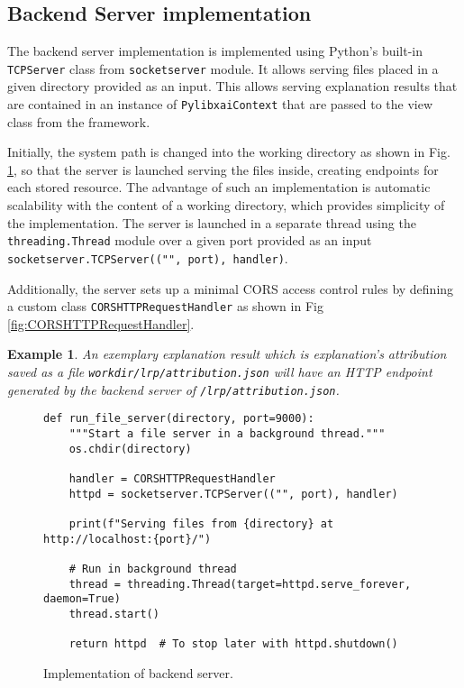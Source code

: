 \documentclass[
    bindingoffset=5mm,  %
    footnoteindent=3mm, %
    hyphenation=true    %
]{src/wut-thesis}
\newtheorem{example}{Example}
\begin{document}
\subsection{Backend Server implementation} \label{ch5:FileServer}

The backend server implementation is implemented using Python's built-in \texttt{TCPServer} class from
\texttt{socketserver} module. It allows serving files placed in a given directory provided as an input.
This allows serving explanation results that are contained in an instance of \texttt{PylibxaiContext} that
are passed to the view class from the framework.

Initially, the system path is changed into the working directory as shown in Fig. \ref{fig:BackendServer},
so that the server is launched serving the files inside, creating endpoints for each stored resource.
The advantage of such an implementation is automatic scalability with the content of a working directory,
which provides simplicity of the implementation. The server is launched in a separate thread using the 
\texttt{threading.Thread} module over a given port provided as an input
\texttt{socketserver.TCPServer(("", port), handler)}.

Additionally, the server sets up a minimal CORS access control rules by defining a custom
class \texttt{CORSHTTPRequestHandler} as shown in Fig \ref{fig:CORSHTTPRequestHandler}.

\begin{example}
    An exemplary explanation result which is explanation's attribution saved as a file \texttt{workdir/lrp/attribution.json}
    will have an HTTP endpoint generated by the backend server of \texttt{/lrp/attribution.json}.
\end{example}

\begin{figure}%
\begin{verbatim}
def run_file_server(directory, port=9000):
    """Start a file server in a background thread."""
    os.chdir(directory)

    handler = CORSHTTPRequestHandler
    httpd = socketserver.TCPServer(("", port), handler)

    print(f"Serving files from {directory} at http://localhost:{port}/")

    # Run in background thread
    thread = threading.Thread(target=httpd.serve_forever, daemon=True)
    thread.start()

    return httpd  # To stop later with httpd.shutdown()

\end{verbatim}
\caption{Implementation of backend server.}
\label{fig:BackendServer}
\end{figure}
\end{document}

